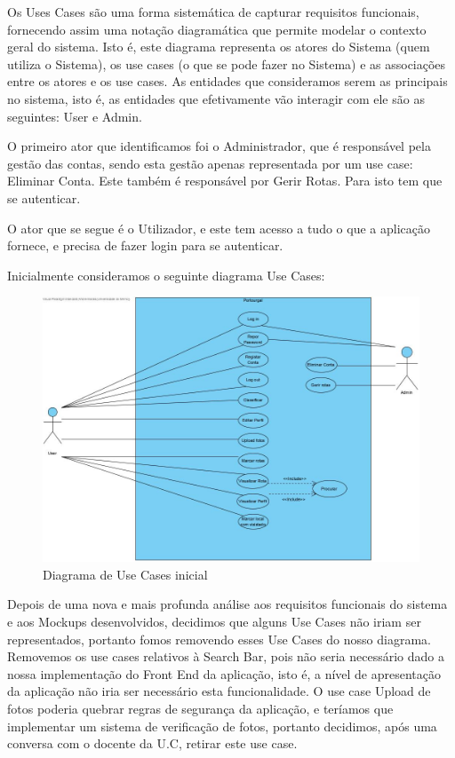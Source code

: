 Os Uses Cases são uma forma sistemática de capturar requisitos funcionais, fornecendo assim uma notação diagramática que permite modelar o contexto geral do sistema. Isto é, este diagrama representa os atores do Sistema (quem utiliza o Sistema), os use cases (o que se pode fazer no Sistema) e as associações entre os atores e os use cases. As entidades que consideramos serem as principais no sistema, isto é, as entidades que efetivamente vão interagir com ele são as seguintes: User e Admin. 

O primeiro ator que identificamos foi o Administrador, que é responsável pela gestão das contas, sendo esta gestão apenas representada por um use case: Eliminar Conta. Este também é responsável por Gerir Rotas. Para isto tem que se autenticar.

O ator que se segue é o Utilizador, e este tem acesso a tudo o que a aplicação fornece, e precisa de fazer login para se autenticar. 

Inicialmente consideramos o seguinte diagrama Use Cases:

\begin{figure}[H]
\centering
\includegraphics[width=0.9\linewidth]{images/usecases.jpg}
\caption{Diagrama de Use Cases inicial}
\label{fig:uc}
\end{figure}


\newpage

Depois de uma nova e mais profunda análise aos requisitos funcionais do sistema e aos Mockups desenvolvidos, decidimos que alguns Use Cases não iriam ser representados, portanto fomos removendo esses Use Cases do nosso diagrama. Removemos os use cases relativos à Search Bar, pois não seria necessário dado a nossa implementação do Front End da aplicação, isto é, a nível de apresentação da aplicação não iria ser necessário esta funcionalidade. O use case Upload de fotos poderia quebrar regras de segurança da aplicação, e teríamos que implementar um sistema de verificação de fotos, portanto decidimos, após uma conversa com o docente da U.C, retirar este use case. 

